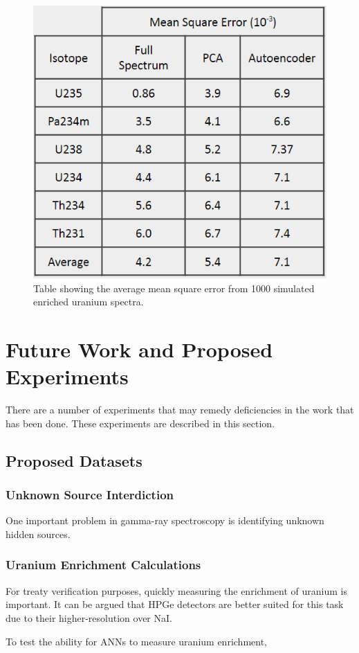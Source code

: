 \documentclass[thesis,tocnosub,noragright,centerchapter,12pt,fullpage]{uiucecethesis09}
\begin{document}
\begin{figure}
    \centering
    \includegraphics[width=0.5\linewidth]{images/enrichment_MSE_table}
    \caption{Table showing the average mean square error from 1000 simulated enriched uranium spectra.}
    \label{fig:enrichment_MSE_table}
\end{figure}



\chapter{Future Work and Proposed Experiments}

There are a number of experiments that may remedy deficiencies in the work that has been done. These experiments are described in this section.

\section{Proposed Datasets}

\subsection{Unknown Source Interdiction}

One important problem in gamma-ray spectroscopy is identifying unknown hidden sources. 

\subsection{Uranium Enrichment Calculations}

For treaty verification purposes, quickly measuring the enrichment of uranium is important. It can be argued that HPGe detectors are better suited for this task due to their higher-resolution over NaI. 

To test the ability for ANNs to measure uranium enrichment, 
\end{document}
